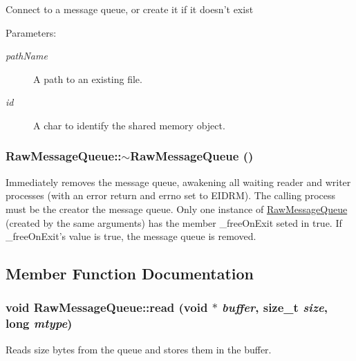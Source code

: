 Connect to a message queue, or create it if it doesn't exist

\begin{Desc}
\item[Parameters:]
\begin{description}
\item[{\em pathName}]A path to an existing file. \item[{\em id}]A char to identify the shared memory object. \end{description}
\end{Desc}
\hypertarget{classRawMessageQueue_741c6b10b9e2b1be969b59194ac0452c}{
\subsubsection[{$\sim$RawMessageQueue}]{\setlength{\rightskip}{0pt plus 5cm}RawMessageQueue::$\sim$RawMessageQueue ()}}
\label{classRawMessageQueue_741c6b10b9e2b1be969b59194ac0452c}


Immediately removes the message queue, awakening all waiting reader and writer processes (with an error return and errno set to EIDRM). The calling process must be the creator the message queue. Only one instance of \hyperlink{classRawMessageQueue}{RawMessageQueue} (created by the same arguments) has the member \_\-freeOnExit seted in true. If \_\-freeOnExit's value is true, the message queue is removed. 

\subsection{Member Function Documentation}
\hypertarget{classRawMessageQueue_0dbcbf9af9fa704119de2d2ef6f90371}{
\subsubsection[{read}]{\setlength{\rightskip}{0pt plus 5cm}void RawMessageQueue::read (void $\ast$ {\em buffer}, \/  size\_\-t {\em size}, \/  long {\em mtype})}}
\label{classRawMessageQueue_0dbcbf9af9fa704119de2d2ef6f90371}


Reads size bytes from the queue and stores them in the buffer.

